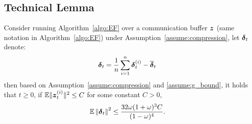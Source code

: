 \subsection{Technical Lemma}
\begin{lemma}
\label{lemma:delta_bound}
Consider running Algorithm~\ref{algo:EF} over a communication buffer $\boldsymbol{z}$ (same notation in Algorithm~\ref{algo:EF}) under Assumption~\ref{assume:compression},
    let $\boldsymbol{\delta}_t$ denote:
    \begin{align*}
    \boldsymbol{\delta}_t =  \frac{1}{n}\sum_{i=1}^{n}\boldsymbol{\delta}^{(i)}_{t} - \overline{\boldsymbol{\delta}}_{t}
    \end{align*}
    then based on Assumption~\ref{assume:compression} and \ref{assume:g_bound}, it holds that $t \geq 0$, if $\mathbb{E}\|\boldsymbol{z}_t^{(i)}\|^2 \leq C$ for some constant $C>0$,
    \begin{align*}
        \mathbb{E}\left\| \boldsymbol{\delta}_{t} \right\|^2 \leq \frac{32\omega(1+\omega)^3C}{(1-\omega)^4}.
    \end{align*}
\end{lemma}
